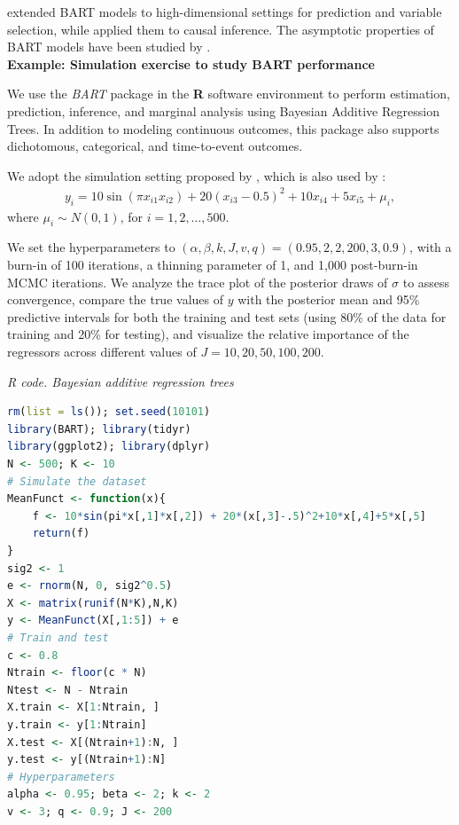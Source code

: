 \cite{linero2018bayesian} extended BART models to high-dimensional settings for prediction and variable selection, while \cite{hill2011bayesian, hahn2020bayesian} applied them to causal inference. The asymptotic properties of BART models have been studied by \cite{rockova2019on, rockova2020posterior, rockova2020semiparametric}.\\

\textbf{Example: Simulation exercise to study BART performance}

We use the \textit{BART} package \cite{sparapani2021nonparametric} in the \textbf{R} software environment to perform estimation, prediction, inference, and marginal analysis using Bayesian Additive Regression Trees. In addition to modeling continuous outcomes, this package also supports dichotomous, categorical, and time-to-event outcomes.

We adopt the simulation setting proposed by \cite{friedman1991multivariate}, which is also used by \cite{chipman2010bart}:
\begin{align*}
	y_i = 10\sin(\pi x_{i1}x_{i2}) + 20(x_{i3}-0.5)^2 + 10 x_{i4} + 5 x_{i5} + \mu_i,
\end{align*}
where \( \mu_i \sim N(0,1) \), for \( i = 1, 2, \dots, 500 \).

We set the hyperparameters to \( (\alpha, \beta, k, J, v, q) = (0.95, 2, 2, 200, 3, 0.9) \), with a burn-in of 100 iterations, a thinning parameter of 1, and 1,000 post-burn-in MCMC iterations. We analyze the trace plot of the posterior draws of \( \sigma \) to assess convergence, compare the true values of \( y \) with the posterior mean and 95\% predictive intervals for both the training and test sets (using 80\% of the data for training and 20\% for testing), and visualize the relative importance of the regressors across different values of \( J = 10, 20, 50, 100, 200 \).

\begin{tcolorbox}[enhanced,width=4.67in,center upper,
	fontupper=\large\bfseries,drop shadow southwest,sharp corners]
	\textit{R code. Bayesian additive regression trees}
	\begin{VF}
		\begin{lstlisting}[language=R]
rm(list = ls()); set.seed(10101)
library(BART); library(tidyr)
library(ggplot2); library(dplyr)
N <- 500; K <- 10
# Simulate the dataset
MeanFunct <- function(x){
	f <- 10*sin(pi*x[,1]*x[,2]) + 20*(x[,3]-.5)^2+10*x[,4]+5*x[,5]
	return(f)
}
sig2 <- 1
e <- rnorm(N, 0, sig2^0.5)
X <- matrix(runif(N*K),N,K)
y <- MeanFunct(X[,1:5]) + e
# Train and test
c <- 0.8
Ntrain <- floor(c * N)
Ntest <- N - Ntrain
X.train <- X[1:Ntrain, ]
y.train <- y[1:Ntrain]
X.test <- X[(Ntrain+1):N, ]
y.test <- y[(Ntrain+1):N]
# Hyperparameters
alpha <- 0.95; beta <- 2; k <- 2
v <- 3; q <- 0.9; J <- 200
\end{lstlisting}
	\end{VF}
\end{tcolorbox}



